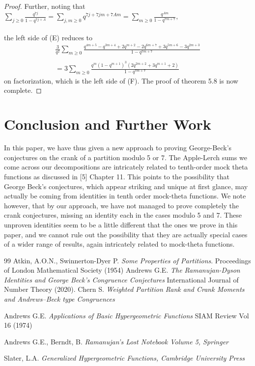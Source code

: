 \documentclass[10pt,reqno]{amsart}
\begin{document}
\begin{proof}
Further, noting that $\displaystyle\sum_{j\geq 0}\displaystyle\frac{q^{7j}}{1-q^{7j+A}}=\displaystyle\sum_{j,m\geq 0}q^{7j+7jm+7Am}=\displaystyle\sum_{m\geq 0}\displaystyle\frac{q^{Am}}{1-q^{7m+7}},$ \\ \\
the left side of (E) reduces to 
\begin{multline*}
    \displaystyle\frac{3}{q^2}\displaystyle\sum_{m\geq 0}\displaystyle\frac{q^{4m+5}-q^{3m+4}+2q^{m+2}-2q^{6m+7}+3q^{5m+6}-3q^{2m+3}}{1-q^{7m+7}} \\ \\
    =3\displaystyle\sum_{m\geq 0}\displaystyle\frac{q^m(1-q^{m+1})^3(2q^{2m+2}+3q^{m+1}+2)}{1-q^{7m+7}}
\end{multline*}
on factorization, which is the left side of (F). The proof of theorem 5.8 is now complete.

\end{proof}
\section{Conclusion and Further Work}
In this paper, we have thus given a new approach to proving George-Beck's conjectures on the crank of a partition modulo 5 or 7. The Apple-Lerch sums we come across our decompositions are intricately related to tenth-order mock theta functions as discussed in [5] Chapter 11. This points to the possibility that George Beck's conjectures, which appear striking and unique at first glance, may actually be coming from identities in tenth order mock-theta functions. We note however, that by our approach, we have not managed to prove completely the crank conjectures, missing an identity each in the cases modulo 5 and 7. These unproven identities seem to be a little different that the ones we prove in this paper, and we cannot rule out the possibility that they are actually special cases of a wider range of results, again intricately related to mock-theta functions.
\begin{thebibliography}{99}
Atkin, A.O.N., Swinnerton-Dyer P.
\emph{Some Properties of Partitions}.
Proceedings of London Mathematical Society (1954)
Andrews G.E.
\textit{The Ramanujan-Dyson Identities and George Beck's Congruence Conjectures}
International Journal of Number Theory (2020).
Chern S.
\textit{Weighted Partition Rank and Crank Moments and Andrews–Beck type Congruences}

Andrews G.E.
\textit{Applications of Basic Hypergeometric Functions}
SIAM Review Vol 16 (1974)

Andrews G.E., Berndt, B.
\textit{Ramanujan's Lost Notebook Volume 5, Springer}

Slater, L.A.
\textit{Generalized Hypergeometric Functions, Cambridge University Press}

\end{thebibliography}
\end{document}
